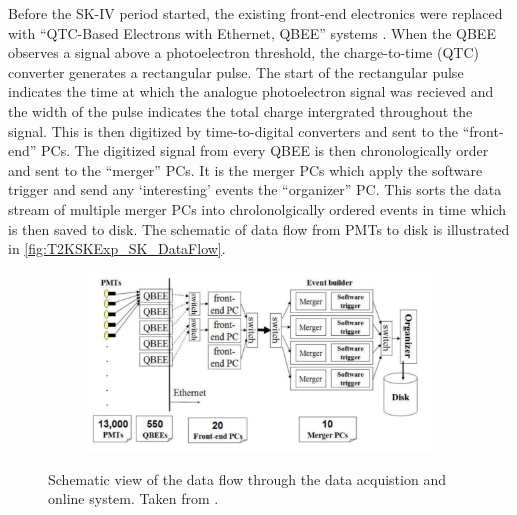 Before the SK-IV period started, the existing front-end electronics were replaced with ``QTC-Based Electrons with Ethernet, QBEE'' systems \cite{Nishino2009-wh}. When the QBEE observes a signal above a  photoelectron threshold, the charge-to-time (QTC) converter generates a rectangular pulse. The start of the rectangular pulse indicates the time at which the analogue photoelectron signal was recieved and the width of the pulse indicates the total charge intergrated throughout the signal. This is then digitized by time-to-digital converters and sent to the ``front-end'' PCs. The digitized signal from every QBEE is then chronologically order and sent to the ``merger'' PCs. It is the merger PCs which apply the software trigger and send any `interesting' events the ``organizer'' PC. This sorts the data stream of multiple merger PCs into chrolonolgically ordered events in time which is then saved to disk. The schematic of data flow from PMTs to disk is illustrated in \autoref{fig:T2KSKExp_SK_DataFlow}.

\begin{figure}[h]
  \begin{subfigure}[t]{0.80\textwidth}
    \includegraphics[width=\textwidth, trim={0mm 0mm 0mm 0mm}, clip,page=1]{Figures/Detectors/SKDataFlow.pdf}
  \end{subfigure}
  \caption{Schematic view of the data flow through the data acquistion and online system. Taken from \cite{5446533}.}
  \label{fig:T2KSKExp_SK_DataFlow}
\end{figure}

